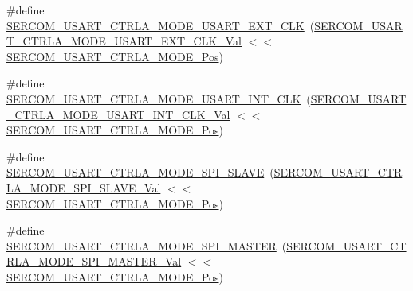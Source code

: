 \begin{DoxyCompactItemize}
\#define \mbox{\hyperlink{group___s_a_m_d21___s_e_r_c_o_m_ga2e6772767127138589368272c832d63d}{S\+E\+R\+C\+O\+M\+\_\+\+U\+S\+A\+R\+T\+\_\+\+C\+T\+R\+L\+A\+\_\+\+M\+O\+D\+E\+\_\+\+U\+S\+A\+R\+T\+\_\+\+E\+X\+T\+\_\+\+C\+LK}}~(\mbox{\hyperlink{group___s_a_m_d21___s_e_r_c_o_m_ga6a775614355cedc653365364b460abb1}{S\+E\+R\+C\+O\+M\+\_\+\+U\+S\+A\+R\+T\+\_\+\+C\+T\+R\+L\+A\+\_\+\+M\+O\+D\+E\+\_\+\+U\+S\+A\+R\+T\+\_\+\+E\+X\+T\+\_\+\+C\+L\+K\+\_\+\+Val}} $<$$<$ \mbox{\hyperlink{group___s_a_m_d21___s_e_r_c_o_m_ga0796e7296d74a5202c5a9fc61ea9ea3b}{S\+E\+R\+C\+O\+M\+\_\+\+U\+S\+A\+R\+T\+\_\+\+C\+T\+R\+L\+A\+\_\+\+M\+O\+D\+E\+\_\+\+Pos}})
\item 
\#define \mbox{\hyperlink{group___s_a_m_d21___s_e_r_c_o_m_gae5a2d901aa8b7ff577bf3ee8eff5a429}{S\+E\+R\+C\+O\+M\+\_\+\+U\+S\+A\+R\+T\+\_\+\+C\+T\+R\+L\+A\+\_\+\+M\+O\+D\+E\+\_\+\+U\+S\+A\+R\+T\+\_\+\+I\+N\+T\+\_\+\+C\+LK}}~(\mbox{\hyperlink{group___s_a_m_d21___s_e_r_c_o_m_gab094f5f023e5151cc90493afb57bcf9a}{S\+E\+R\+C\+O\+M\+\_\+\+U\+S\+A\+R\+T\+\_\+\+C\+T\+R\+L\+A\+\_\+\+M\+O\+D\+E\+\_\+\+U\+S\+A\+R\+T\+\_\+\+I\+N\+T\+\_\+\+C\+L\+K\+\_\+\+Val}} $<$$<$ \mbox{\hyperlink{group___s_a_m_d21___s_e_r_c_o_m_ga0796e7296d74a5202c5a9fc61ea9ea3b}{S\+E\+R\+C\+O\+M\+\_\+\+U\+S\+A\+R\+T\+\_\+\+C\+T\+R\+L\+A\+\_\+\+M\+O\+D\+E\+\_\+\+Pos}})
\item 
\#define \mbox{\hyperlink{group___s_a_m_d21___s_e_r_c_o_m_ga8d25d8144f586aaf9c29bc2f4b65823a}{S\+E\+R\+C\+O\+M\+\_\+\+U\+S\+A\+R\+T\+\_\+\+C\+T\+R\+L\+A\+\_\+\+M\+O\+D\+E\+\_\+\+S\+P\+I\+\_\+\+S\+L\+A\+VE}}~(\mbox{\hyperlink{group___s_a_m_d21___s_e_r_c_o_m_ga695f8c611a128fcad98db74eb2105430}{S\+E\+R\+C\+O\+M\+\_\+\+U\+S\+A\+R\+T\+\_\+\+C\+T\+R\+L\+A\+\_\+\+M\+O\+D\+E\+\_\+\+S\+P\+I\+\_\+\+S\+L\+A\+V\+E\+\_\+\+Val}} $<$$<$ \mbox{\hyperlink{group___s_a_m_d21___s_e_r_c_o_m_ga0796e7296d74a5202c5a9fc61ea9ea3b}{S\+E\+R\+C\+O\+M\+\_\+\+U\+S\+A\+R\+T\+\_\+\+C\+T\+R\+L\+A\+\_\+\+M\+O\+D\+E\+\_\+\+Pos}})
\item 
\#define \mbox{\hyperlink{group___s_a_m_d21___s_e_r_c_o_m_ga2f249926e06f70cd6217d27e0c63dcce}{S\+E\+R\+C\+O\+M\+\_\+\+U\+S\+A\+R\+T\+\_\+\+C\+T\+R\+L\+A\+\_\+\+M\+O\+D\+E\+\_\+\+S\+P\+I\+\_\+\+M\+A\+S\+T\+ER}}~(\mbox{\hyperlink{group___s_a_m_d21___s_e_r_c_o_m_gae0b992b3e822d2aaab69a27df027b8ef}{S\+E\+R\+C\+O\+M\+\_\+\+U\+S\+A\+R\+T\+\_\+\+C\+T\+R\+L\+A\+\_\+\+M\+O\+D\+E\+\_\+\+S\+P\+I\+\_\+\+M\+A\+S\+T\+E\+R\+\_\+\+Val}} $<$$<$ \mbox{\hyperlink{group___s_a_m_d21___s_e_r_c_o_m_ga0796e7296d74a5202c5a9fc61ea9ea3b}{S\+E\+R\+C\+O\+M\+\_\+\+U\+S\+A\+R\+T\+\_\+\+C\+T\+R\+L\+A\+\_\+\+M\+O\+D\+E\+\_\+\+Pos}})

\end{DoxyCompactItemize}
